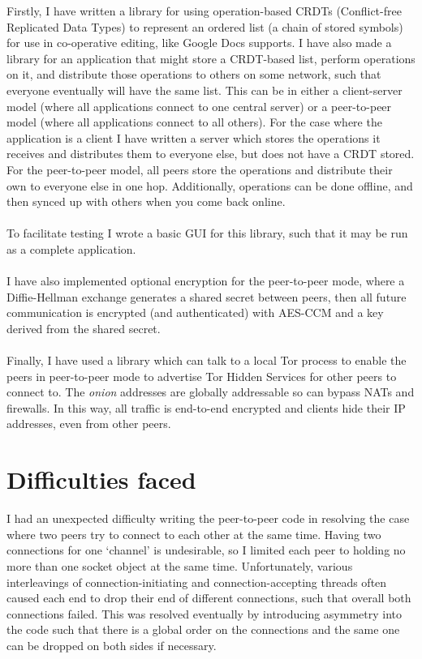 \documentclass[12pt,a4paper]{article}
\begin{document}
Firstly, I have written a library for using operation-based CRDTs (Conflict-free Replicated Data Types) to represent an ordered list (a chain of stored symbols) for use in co-operative editing, like Google Docs supports. I have also made a library for an application that might store a CRDT-based list, perform operations on it, and distribute those operations to others on some network, such that everyone eventually will have the same list. This can be in either a client-server model (where all applications connect to one central server) or a peer-to-peer model (where all applications connect to all others). For the case where the application is a client I have written a server which stores the operations it receives and distributes them to everyone else, but does not have a CRDT stored. For the peer-to-peer model, all peers store the operations and distribute their own to everyone else in one hop. Additionally, operations can be done offline, and then synced up with others when you come back online.
\\\\
To facilitate testing I wrote a basic GUI for this library, such that it may be run as a complete application.
\\\\
I have also implemented optional encryption for the peer-to-peer mode, where a Diffie-Hellman exchange generates a shared secret between peers, then all future communication is encrypted (and authenticated) with AES-CCM and a key derived from the shared secret.
\\\\
Finally, I have used a library which can talk to a local Tor process to enable the peers in peer-to-peer mode to advertise Tor Hidden Services for other peers to connect to. The \textit{onion} addresses are globally addressable so can bypass NATs and firewalls. In this way, all traffic is end-to-end encrypted and clients hide their IP addresses, even from other peers.
\section*{Difficulties faced}
I had an unexpected difficulty writing the peer-to-peer code in resolving the case where two peers try to connect to each other at the same time. Having two connections for one `channel' is undesirable, so I limited each peer to holding no more than one socket object at the same time. Unfortunately, various interleavings of connection-initiating and connection-accepting threads often caused each end to drop their end of different connections, such that overall both connections failed. This was resolved eventually by introducing asymmetry into the code such that there is a global order on the connections and the same one can be dropped on both sides if necessary.
\end{document}
